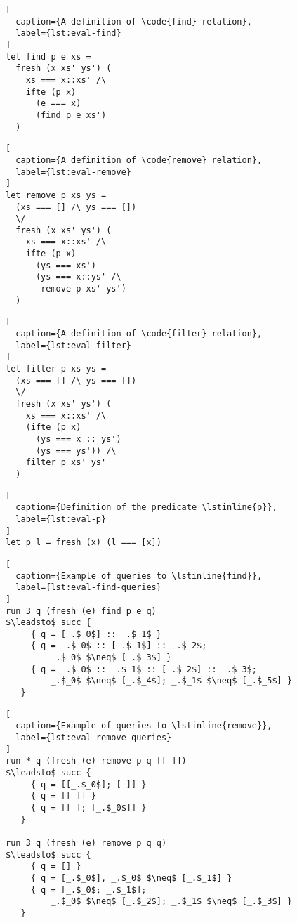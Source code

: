 \begin{minipage}[thb]{.3\textwidth}
\begin{lstlisting}[
  caption={A definition of \code{find} relation},
  label={lst:eval-find}
]
let find p e xs =
  fresh (x xs' ys') (
    xs === x::xs' /\
    ifte (p x)
      (e === x)
      (find p e xs')
  )
\end{lstlisting}
\end{minipage}\hfill
\begin{minipage}[thb]{.3\textwidth}
\begin{lstlisting}[
  caption={A definition of \code{remove} relation},
  label={lst:eval-remove}
]
let remove p xs ys =
  (xs === [] /\ ys === [])
  \/
  fresh (x xs' ys') (
    xs === x::xs' /\
    ifte (p x)
      (ys === xs')
      (ys === x::ys' /\ 
       remove p xs' ys')
  )
\end{lstlisting}
\end{minipage}\hfill
\begin{minipage}[thb]{.3\textwidth}
\begin{lstlisting}[
  caption={A definition of \code{filter} relation},
  label={lst:eval-filter}
]
let filter p xs ys =
  (xs === [] /\ ys === [])
  \/
  fresh (x xs' ys') (
    xs === x::xs' /\
    (ifte (p x)
      (ys === x :: ys')
      (ys === ys')) /\
    filter p xs' ys'
  )
\end{lstlisting}
\end{minipage}


\begin{minipage}[thb]{0.4\textwidth}
\begin{lstlisting}[
  caption={Definition of the predicate \lstinline{p}},
  label={lst:eval-p}
]
let p l = fresh (x) (l === [x])
\end{lstlisting}
\begin{lstlisting}[
  caption={Example of queries to \lstinline{find}},
  label={lst:eval-find-queries}
]
run 3 q (fresh (e) find p e q) 
$\leadsto$ succ {
     { q = [_.$_0$] :: _.$_1$ }
     { q = _.$_0$ :: [_.$_1$] :: _.$_2$; 
         _.$_0$ $\neq$ [_.$_3$] }
     { q = _.$_0$ :: _.$_1$ :: [_.$_2$] :: _.$_3$; 
         _.$_0$ $\neq$ [_.$_4$]; _.$_1$ $\neq$ [_.$_5$] }
   }
\end{lstlisting}
\end{minipage}\hfill
\begin{minipage}[thb]{0.4\textwidth}
\begin{lstlisting}[
  caption={Example of queries to \lstinline{remove}},
  label={lst:eval-remove-queries}
]
run * q (fresh (e) remove p q [[ ]]) 
$\leadsto$ succ {
     { q = [[_.$_0$]; [ ]] }
     { q = [[ ]] }
     { q = [[ ]; [_.$_0$]] }
   }

run 3 q (fresh (e) remove p q q) 
$\leadsto$ succ {
     { q = [] }
     { q = [_.$_0$], _.$_0$ $\neq$ [_.$_1$] }
     { q = [_.$_0$; _.$_1$]; 
         _.$_0$ $\neq$ [_.$_2$]; _.$_1$ $\neq$ [_.$_3$] }
   }
\end{lstlisting}
\end{minipage}

